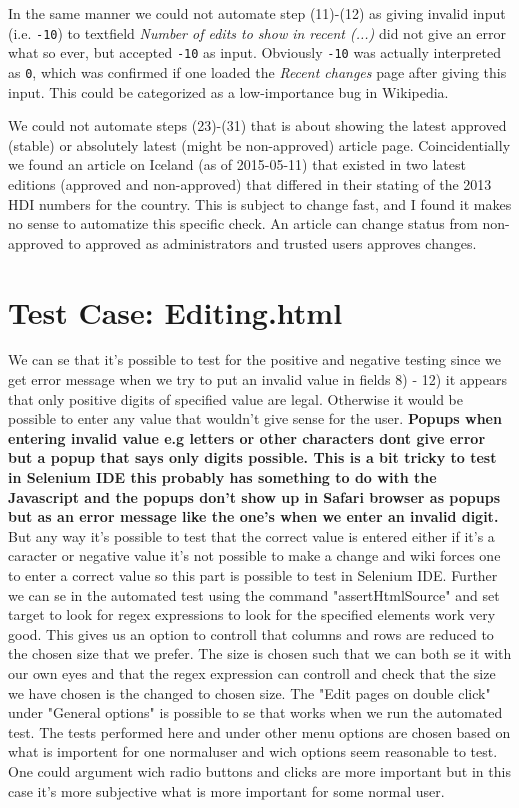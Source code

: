 \documentclass[a4paper,10pt]{article}
\begin{document}
In the same manner we could not automate step (11)-(12) as giving invalid input (i.e. \texttt{-10}) to textfield \textit{Number of edits to show in recent (...)} 
did not give an error what so ever, but accepted \texttt{-10} as input. Obviously \texttt{-10} was actually interpreted as \texttt{0}, which was confirmed if 
one loaded the \textit{Recent changes} page after giving this input. This could be categorized as a low-importance bug in Wikipedia.

We could not automate steps (23)-(31) that is about showing the latest approved (stable) or absolutely latest (might be non-approved) article page. Coincidentially we 
found an article on Iceland (as of 2015-05-11) that existed in two latest editions (approved and non-approved) that differed in their stating of the 2013 HDI numbers for the country. This 
is subject to change fast, and I found it makes no sense to automatize this specific check. An article can change status from non-approved to approved as administrators and 
trusted users approves changes.


\section*{Test Case: Editing.html}

We can se that it’s possible to test for the positive and negative testing since we get error message when we
try to put an invalid value in fields 8) - 12) it appears that only positive digits of specified value are legal. Otherwise
it would be possible to enter any value that wouldn’t give sense for the user. \textbf{\color{red}Popups when entering invalid value e.g letters
or other characters dont give error but a popup that says only digits possible. This is a bit tricky to test in Selenium IDE this
probably has something to do with the Javascript and the popups don't show up in Safari browser as popups but as an error message
like the one's when we enter an invalid digit.} But any way it's possible to test that the correct value is entered either if 
it's a caracter or negative value it's not possible to make a change and wiki forces one to enter a correct value so this part
is possible to test in Selenium IDE. Further we can se in the automated test using the command "assertHtmlSource" and set target
to look for regex expressions to look for the specified elements work very good. This gives us an option to controll that 
columns and rows are reduced to the chosen size that we prefer. The size is chosen such that we can both se it with our own
eyes and that the regex expression can controll and check that the size we have chosen is the changed to chosen size.
The "Edit pages on double click" under "General options" is possible to se that works when we run the automated test.
The tests performed here and under other menu options are chosen based on what is importent for one normaluser and
wich options seem reasonable to test. One could argument wich radio buttons and clicks are more important but in this case
it's more subjective what is more important for some normal user.
\end{document}
